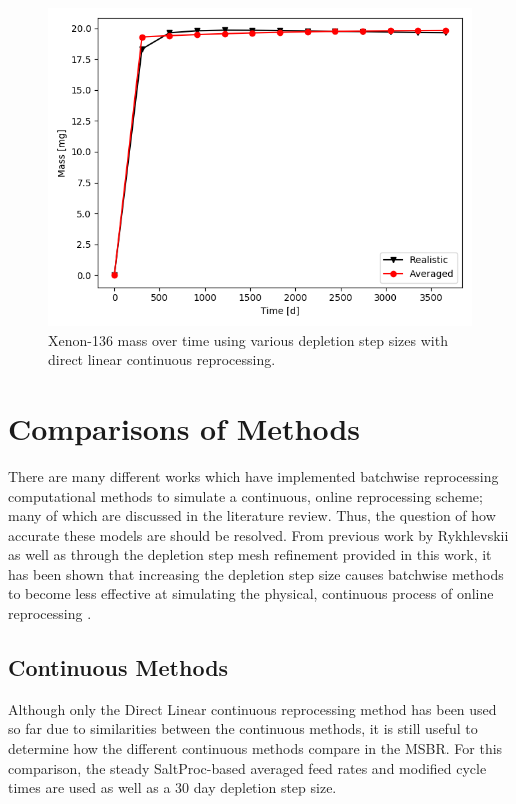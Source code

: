 \begin{figure}[H]
  \centering
  \includegraphics[scale=0.7]{images/adv-Xe136.png}
  \caption{Xenon-136 mass over time using various depletion step sizes with direct linear continuous reprocessing.}
   \label{fig:DL-cont-xe136-adv}
\end{figure}

\section{Comparisons of Methods}

There are many different works which have implemented batchwise reprocessing computational methods to simulate a continuous, online reprocessing scheme; many of which are discussed in the literature review. Thus, the question of how accurate these models are should be resolved. From previous work by Rykhlevskii as well as through the depletion step mesh refinement provided in this work, it has been shown that increasing the depletion step size causes batchwise methods to become less effective at simulating the physical, continuous process of online reprocessing \cite{rykhlevskii_fuel_2020}.

\subsection{Continuous Methods}

Although only the Direct Linear continuous reprocessing method has been used so far due to similarities between the continuous methods, it is still useful to determine how the different continuous methods compare in the MSBR.   For this comparison, the steady SaltProc-based averaged feed rates and modified cycle times are used as well as a 30 day depletion step size.


